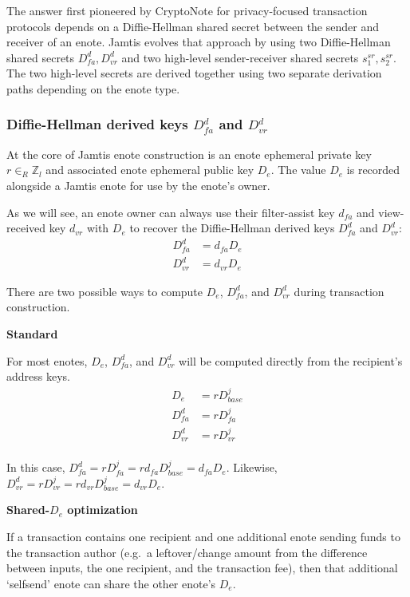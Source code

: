 The answer first pioneered by CryptoNote \cite{cryptoNoteWhitePaper} for privacy-focused transaction protocols depends on a Diffie-Hellman shared secret between the sender and receiver of an enote. Jamtis evolves that approach by using two Diffie-Hellman shared secrets $D^d_{fa}, D^d_{vr}$ and two high-level sender-receiver shared secrets $s^{sr}_1, s^{sr}_2$. The two high-level secrets are derived together using two separate derivation paths depending on the enote type.

\subsubsection{Diffie-Hellman derived keys $D^d_{fa}$ and $D^d_{vr}$}
\label{subsubsec:jamtis-srsecret-DH-derived-key}

At the core of Jamtis enote construction is an enote ephemeral private key $r \in_R \mathbb{Z}_l$ and associated enote ephemeral public key $D_e$. The value $D_e$ is recorded alongside a Jamtis enote for use by the enote's owner.

As we will see, an enote owner can always use their filter-assist key $d_{fa}$ and view-received key $d_{vr}$ with $D_e$ to recover the Diffie-Hellman derived keys $D^d_{fa}$ and $D^d_{vr}$:\vspace{.115cm}
\begin{align*}
    D^d_{fa} &= d_{fa} D_e \\
    D^d_{vr} &= d_{vr} D_e
\end{align*}

There are two possible ways to compute $D_e$, $D^d_{fa}$, and $D^d_{vr}$ during transaction construction.

\textbf{Standard}

For most enotes, $D_e$, $D^d_{fa}$, and $D^d_{vr}$ will be computed directly from the recipient's address keys.\vspace{.115cm}
\begin{align*}
    D_e      &= r D^j_{base} \\
    D^d_{fa} &= r D^j_{fa} \\
    D^d_{vr} &= r D^j_{vr} \\
\end{align*}

In this case, $D^d_{fa} = r D^j_{fa} = r d_{fa} D^j_{base} = d_{fa} D_e$. Likewise, $D^d_{vr} = r D^j_{vr} = r d_{vr} D^j_{base} = d_{vr} D_e$.

\textbf{Shared-$D_e$ optimization}

If a transaction contains one recipient and one additional enote sending funds to the transaction author (e.g.\ a leftover/change amount from the difference between inputs, the one recipient, and the transaction fee), then that additional `selfsend' enote can share the other enote's $D_e$.

